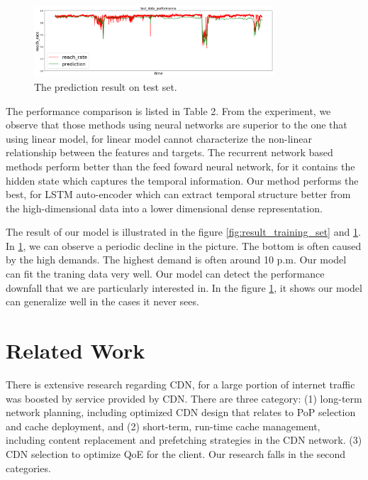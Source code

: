\documentclass[5p]{elsarticle}
\begin{document}
\begin{figure}[h]
    \centering
    \includegraphics[width=0.8\textwidth]{result_test_set.png}
    \caption{The prediction result on test set.}
    \label{fig:result_test_set}
\end{figure}




The performance comparison is listed in Table 2. From the experiment, we observe that those methods using neural networks are superior to the one that using linear model, for linear model cannot characterize the non-linear relationship between the features and targets. The recurrent network based methods perform better than the feed foward neural network, for it contains the hidden state which captures the temporal information. Our method performs the best, for LSTM auto-encoder which can extract temporal structure  better from the high-dimensional data into a lower dimensional dense representation.

The result of our model is illustrated in the figure \ref{fig:result_training_set} and \ref{fig:result_test_set}. In \ref{fig:result_test_set}, we can observe a periodic decline in the picture. The bottom is often caused by the high demands. The highest demand is often around 10 p.m. Our model can fit the traning data very well. Our model can detect the performance downfall that we are particularly interested in. In the figure \ref{fig:result_test_set}, it shows our model can generalize well in the cases it never sees.

\section{Related Work}

There is extensive research regarding CDN, for a large portion of internet traffic was boosted by service provided by CDN. There are three category: (1) long-term network planning, including optimized CDN design that relates to PoP selection and cache deployment\cite{Krishnan2000}\cite{Hasan2014}\cite{Tang2017RethinkingDemands}, and (2) short-term, run-time cache management, including content replacement and prefetching strategies in the CDN network\cite{Borst2010}\cite{Leconte2016}\cite{Applegate2016}. (3) CDN selection to optimize QoE for the client\cite{Jiang2017Pytheas:Exploration-Exploitation}\cite{JiangCFA:Optimization}. Our research falls in the second categories.
\end{document}
